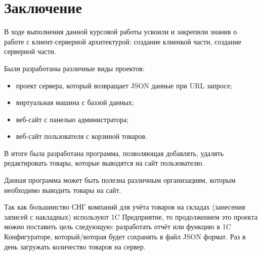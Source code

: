\newpage

\section*{Заключение}
{}

В ходе выполнения данной курсовой работы усвоили и закрепили знания о работе с клиент-серверной архитектурой:
создание клиенкой части, создание серверной части.

Были разработаны различные виды проектов:

\begin{itemize}
    \item проект сервера, который возвращает JSON данные при URL запросе;
    \item виртуальная машина с баззой данных;
    \item веб-сайт с панелью администратора;
    \item веб-сайт пользователя с корзиной товаров.
\end{itemize}
	
В итоге была разработана программа,
позволяющая добавлять, удалять редактировать товары, которые выводятся на сайт пользователю.

Данная программа может быть полезна различным организациям,
которым необходимо выводить товары на сайт.

Так как большинство СНГ компаний для учёта товаров на складах (занесения записей с накладных) используют
1C Предприятие, то продолжением это проекта можно поставить цель следующую: 
разработать отчёт или функцию в 1C Конфигураторе, который/которая будет сохранять в файл JSON формат.
Раз в день загружать количество товаров на сервер.  

\newpage
